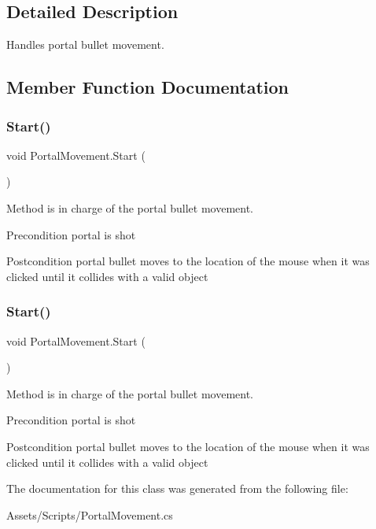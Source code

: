 \subsection{Detailed Description}
Handles portal bullet movement. 

\subsection{Member Function Documentation}
\mbox{\label{class_portal_movement_aa7beca3afea663ec0de74142ac852ca4}} 
\subsubsection{\texorpdfstring{Start()}{Start()}\hspace{0.1cm}{\footnotesize\ttfamily [1/2]}}
{\footnotesize\ttfamily void Portal\+Movement.\+Start (\begin{DoxyParamCaption}{ }\end{DoxyParamCaption})\hspace{0.3cm}{\ttfamily [inline]}}

Method is in charge of the portal bullet movement. \begin{DoxyPrecond}{Precondition}
portal is shot 
\end{DoxyPrecond}
\begin{DoxyPostcond}{Postcondition}
portal bullet moves to the location of the mouse when it was clicked until it collides with a valid object 
\end{DoxyPostcond}
\mbox{\label{class_portal_movement_aa7beca3afea663ec0de74142ac852ca4}} 
\subsubsection{\texorpdfstring{Start()}{Start()}\hspace{0.1cm}{\footnotesize\ttfamily [2/2]}}
{\footnotesize\ttfamily void Portal\+Movement.\+Start (\begin{DoxyParamCaption}{ }\end{DoxyParamCaption})\hspace{0.3cm}{\ttfamily [inline]}}

Method is in charge of the portal bullet movement. \begin{DoxyPrecond}{Precondition}
portal is shot 
\end{DoxyPrecond}
\begin{DoxyPostcond}{Postcondition}
portal bullet moves to the location of the mouse when it was clicked until it collides with a valid object 
\end{DoxyPostcond}


The documentation for this class was generated from the following file\+:\begin{DoxyCompactItemize}
\item 
Assets/\+Scripts/Portal\+Movement.\+cs\end{DoxyCompactItemize}
